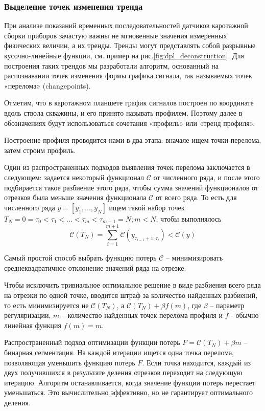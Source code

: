 \subsubsection{Выделение точек изменения тренда}
\par
При анализе показаний временных последовательностей датчиков каротажной сборки приборов зачастую важны не мгновенные значения измеренных физических величин, а их тренды. Тренды могут представлять собой разрывные кусочно-линейные функции, см. пример на рис.\ref{fig:dpl_deconstruction}. Для построения таких трендов мы разработали алгоритм, основанный на распознавании точек изменения формы графика сигнала, так называемых точек «перелома» (changepoints).  
\par
Отметим, что в каротажном планшете график сигналов построен по координате вдоль ствола скважины, и его принято называть профилем. Поэтому далее в обозначениях будут использоваться сочетания «профиль» или «тренд профиля». 
\par
Построение профиля проводится нами в два этапа: вначале ищем точки перелома, затем строим профиль.
\par
Один из распространенных подходов выявления точек перелома заключается в следующем: задается некоторый функционал $\mathcal{C}$ от численного ряда, и после этого подбирается такое разбиение этого ряда, чтобы сумма значений функционалов от отрезков была меньше значения функционала $\mathcal{C}$ от всего ряда. То есть для численного ряда $y=[y_1,...,y_N]$ ищем такой набор точек $T_N={0=\tau_0<\tau_1< ...<\tau_m<\tau_{m+1}=N; m<N}$, чтобы выполнялось
\begin{equation}
    \mathcal{C}(T_N) = \sum_{i=1}^{m+1}\mathcal{C}\left(y_{\tau_{i-1}+1:\tau_i}\right)<\mathcal{C}(y)
\end{equation}
\par
Самый простой способ выбрать функцию потерь $\mathcal{C}$ – минимизировать среднеквадратичное отклонение значений ряда на отрезке.
\par
Чтобы исключить тривиальное оптимальное решение в виде разбиения всего ряда на отрезки по одной точке, вводится штраф за количество найденных разбиений, то есть минимизируется не $\mathcal{C}(T_N)$, а $\mathcal{C}(T_N)+\beta f(m)$, где $\beta$ – параметр регуляризации, $m$ – количество найденных точек перелома профиля и $f$ - обычно линейная функция $f(m)=m$.
\par
Распространенный подход оптимизации функции потерь $F=\mathcal{C}(T_N)+\beta m$ – бинарная сегментация. На каждой итерации ищется одна точка перелома, позволяющая уменьшить функцию потерь $F$. Если точка находится, каждый из двух получившихся в результате деления отрезков переходит на следующую итерацию. Алгоритм останавливается, когда значение функции потерь перестает уменьшаться. Это вычислительно эффективно, но не гарантирует оптимального деления.
